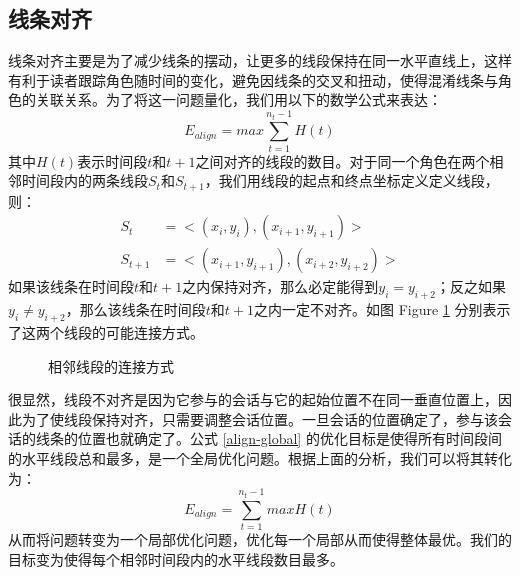 \subsection{线条对齐}
线条对齐主要是为了减少线条的摆动，让更多的线段保持在同一水平直线上，这样有利于读者跟踪角色随时间的变化，避免因线条的交叉和扭动，使得混淆线条与角色的关联关系。为了将这一问题量化，我们用以下的数学公式来表达：
\begin{equation}
\label{align-global}
E_{align} = max \sum_{t=1}^{n_t-1} H\left(t\right)
\end{equation}
其中$H\left(t\right)$表示时间段$t$和$t+1$之间对齐的线段的数目。对于同一个角色在两个相邻时间段内的两条线段$S_t$和$S_{t+1}$，我们用线段的起点和终点坐标定义定义线段，则：
\begin{subequations}
\begin{align}
	S_t & = <(x_i, y_i), (x_{i+1},y_{i+1})> \label{eq:segment-1}\\
	S_{t+1} & = <(x_{i+1}, y_{i+1}), (x_{i+2},y_{i+2})> \label{eq:segment-2}
\end{align}
\end{subequations}
如果该线条在时间段$t$和$t+1$之内保持对齐，那么必定能得到$y_i = y_{i+2}$；反之如果$y_i \neq y_{i+2}$，那么该线条在时间段$t$和$t+1$之内一定不对齐。如图 Figure \ref{fig:line-segment-layout} 分别表示了这两个线段的可能连接方式。
\begin{figure}[!h]
  \caption{相邻线段的连接方式}
  \label{fig:line-segment-layout}
\end{figure}

很显然，线段不对齐是因为它参与的会话与它的起始位置不在同一垂直位置上，因此为了使线段保持对齐，只需要调整会话位置。一旦会话的位置确定了，参与该会话的线条的位置也就确定了。公式 \ref{align-global} 的优化目标是使得所有时间段间的水平线段总和最多，是一个全局优化问题。根据上面的分析，我们可以将其转化为：
\begin{equation}
\label{align-local}
E_{align} = \sum_{t=1}^{n_t-1} max H\left(t\right)
\end{equation}
从而将问题转变为一个局部优化问题，优化每一个局部从而使得整体最优。我们的目标变为使得每个相邻时间段内的水平线段数目最多。

